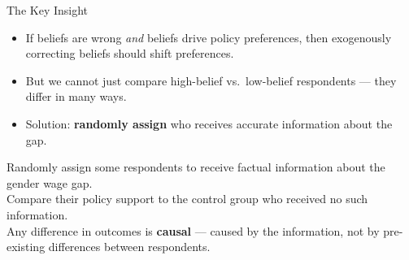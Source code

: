 \documentclass[aspectratio=169, 11pt]{beamer}
\begin{document}

\begin{frame}[t]{The Key Insight}
\begin{itemize}
  \setlength\itemsep{0.5em}
  \item If beliefs are wrong \emph{and} beliefs drive policy preferences, then exogenously correcting beliefs should shift preferences.
  \item But we cannot just compare high-belief vs.\ low-belief respondents — they differ in many ways.
  \item Solution: \textbf{randomly assign} who receives accurate information about the gap.
\end{itemize}
\vspace{0.5em}
\begin{intuitionbox}
Randomly assign some respondents to receive factual information about the gender wage gap.\\[0.3em]
Compare their policy support to the control group who received no such information.\\[0.3em]
Any difference in outcomes is \textbf{causal} — caused by the information, not by pre-existing differences between respondents.
\end{intuitionbox}
\end{frame}

\end{document}
